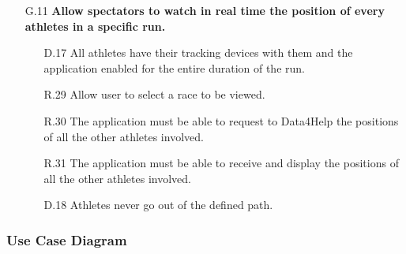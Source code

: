 \begin{enumerate}
\begin{enumerate}
	\item [G.11] \textbf{Allow spectators to watch in real time the position of every athletes in a specific run.}
		\begin{enumerate}
		\item [D.17] All athletes have their tracking devices with them and the application enabled for the entire duration of the run.	
		\item [R.29] Allow user to select a race to be viewed.
		\item [R.30] The application must be able to request to Data4Help the positions of all the other athletes involved.
		\item [R.31] The application must be able to receive and display the positions of all the other athletes involved.
		\item [D.18] Athletes never go out of the defined path.
		\end{enumerate}
	\end{enumerate}

\end{enumerate}

\subsubsection{Use Case Diagram}

